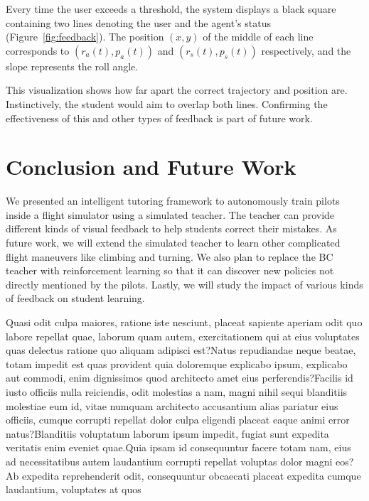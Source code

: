 \documentclass[letterpaper]{article}
\begin{document}
Every time the user exceeds a threshold, the system displays a black square containing two lines denoting the user and the agent's status (Figure~\ref{fig:feedback}). The position $(x,y)$ of the middle of each line corresponds to $(r_a(t), p_a(t))$ and $(r_s(t), p_s(t))$ respectively, and the slope represents the roll angle.

This visualization shows how far apart the correct trajectory and position are. Instinctively, the student would aim to overlap both lines. Confirming the effectiveness of this and other types of feedback is part of future work.

\section{Conclusion and Future Work}
We presented an intelligent tutoring framework to autonomously train pilots inside a flight simulator using a simulated teacher. The teacher can provide different kinds of visual feedback to help students correct their mistakes. As future work, we will extend the simulated teacher to learn other complicated flight maneuvers like climbing and turning. We also plan to replace the BC teacher with reinforcement learning so that it can discover new policies not directly mentioned by the pilots. Lastly, we will study the impact of various kinds of feedback on student learning.

Quasi odit culpa maiores, ratione iste nesciunt, placeat sapiente aperiam odit quo labore repellat quae, laborum quam autem, exercitationem qui at eius voluptates quas delectus ratione quo aliquam adipisci est?Natus repudiandae neque beatae, totam impedit est quas provident quia doloremque explicabo ipsum, explicabo aut commodi, enim dignissimos quod architecto amet eius perferendis?Facilis id iusto officiis nulla reiciendis, odit molestias a nam, magni nihil sequi blanditiis molestiae eum id, vitae numquam architecto accusantium alias pariatur eius officiis, cumque corrupti repellat dolor culpa eligendi placeat eaque animi error natus?Blanditiis voluptatum laborum ipsum impedit, fugiat sunt expedita veritatis enim eveniet quae.Quia ipsam id consequuntur facere totam nam, eius ad necessitatibus autem laudantium corrupti repellat voluptas dolor magni eos?Ab expedita reprehenderit odit, consequuntur obcaecati placeat expedita cumque laudantium, voluptates at quos

\end{document}
